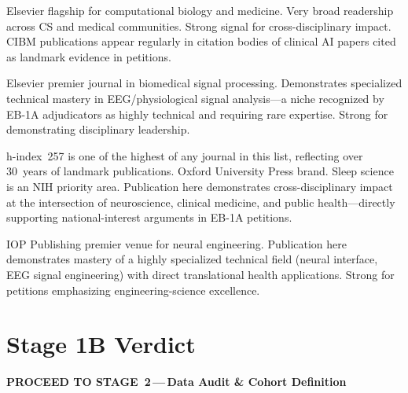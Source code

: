 \documentclass[a4paper,11pt]{article}
\begin{document}
\begin{tcolorbox}[journalbox,
  title={CIBM {\normalfont\small(IS~8.35, Q1, h\,=\,164)}}]
Elsevier flagship for computational biology and medicine. Very broad readership across
CS and medical communities. Strong signal for cross-disciplinary impact. CIBM
publications appear regularly in citation bodies of clinical AI papers cited as landmark
evidence in petitions.
\end{tcolorbox}

\begin{tcolorbox}[journalbox,
  title={BSPC {\normalfont\small(IS~7.99, Q1, h\,=\,141)}}]
Elsevier premier journal in biomedical signal processing. Demonstrates specialized
technical mastery in EEG/physiological signal analysis---a niche recognized by EB-1A
adjudicators as highly technical and requiring rare expertise. Strong for demonstrating
disciplinary leadership.
\end{tcolorbox}

\begin{tcolorbox}[journalbox,
  title={Sleep / Oxford {\normalfont\small(IS~4.03, Q1, h\,=\,257)}}]
h-index~257 is one of the highest of any journal in this list, reflecting over 30~years
of landmark publications. Oxford University Press brand. Sleep science is an NIH
priority area. Publication here demonstrates cross-disciplinary impact at the
intersection of neuroscience, clinical medicine, and public health---directly supporting
national-interest arguments in EB-1A petitions.
\end{tcolorbox}

\begin{tcolorbox}[journalbox,
  title={J.\ Neural Engineering {\normalfont\small(IS~4.07, Q1, h\,=\,151)}}]
IOP Publishing premier venue for neural engineering. Publication here demonstrates
mastery of a highly specialized technical field (neural interface, EEG signal
engineering) with direct translational health applications. Strong for petitions
emphasizing engineering-science excellence.
\end{tcolorbox}

\section{Stage 1B Verdict}

\begin{tcolorbox}[verdictbox, title=VERDICT]
  \textbf{\large\color{verdgreen}%
    PROCEED TO STAGE~2\,---\,Data Audit \& Cohort Definition}
\end{tcolorbox}
\end{document}

